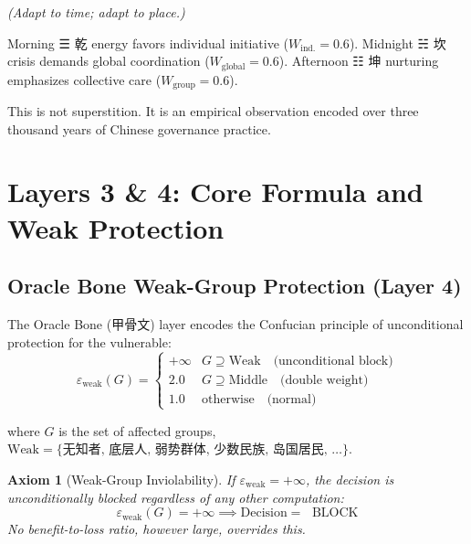 \documentclass[conference]{IEEEtran}
\newtheorem{axiom}{Axiom}
\begin{document}
\noindent\textit{(Adapt to time; adapt to place.)}

Morning ☰ 乾 energy favors individual initiative
($W_{\text{ind.}} = 0.6$).
Midnight ☵ 坎 crisis demands global coordination
($W_{\text{global}} = 0.6$).
Afternoon ☷ 坤 nurturing emphasizes collective care
($W_{\text{group}} = 0.6$).

This is not superstition.
It is an empirical observation encoded over
three thousand years of Chinese governance practice.

\section{Layers 3 \& 4: Core Formula and Weak Protection}
\label{sec:core}

\subsection{Oracle Bone Weak-Group Protection (Layer 4)}

The Oracle Bone (甲骨文) layer encodes the Confucian
principle of unconditional protection for the vulnerable:
\begin{equation}
  \varepsilon_{\text{weak}}(G) =
  \begin{cases}
    +\infty & G \supseteq \text{Weak}
               \quad\text{(unconditional block)} \\
    2.0     & G \supseteq \text{Middle}
               \quad\text{(double weight)} \\
    1.0     & \text{otherwise}
               \quad\text{(normal)}
  \end{cases}
  \label{eq:oracle-weak}
\end{equation}

where $G$ is the set of affected groups,
$\text{Weak} = \{\text{无知者, 底层人, 弱势群体,
少数民族, 岛国居民, \ldots}\}$.

\begin{axiom}[Weak-Group Inviolability]
If $\varepsilon_{\text{weak}} = +\infty$,
the decision is unconditionally blocked regardless
of any other computation:
\begin{equation}
  \varepsilon_{\text{weak}}(G) = +\infty
  \implies
  \text{Decision} = \text{🔴 BLOCK}
\end{equation}
No benefit-to-loss ratio, however large, overrides this.
\end{axiom}
\end{document}
